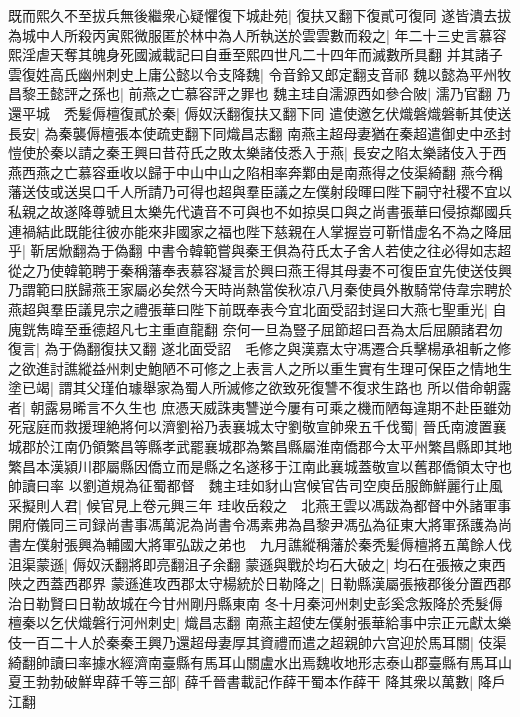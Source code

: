 既而熙久不至拔兵無後繼衆心疑懼復下城赴苑|{
	復扶又翻下復貳可復同}
遂皆潰去拔為城中人所殺丙寅熙微服匿於林中為人所執送於雲雲數而殺之|{
	年二十三史言慕容熙淫虐天奪其魄身死國滅載記曰自垂至熙四世凡二十四年而滅數所具翻}
并其諸子雲復姓高氏幽州刺史上庸公懿以令支降魏|{
	令音鈴又郎定翻支音祁}
魏以懿為平州牧昌黎王懿評之孫也|{
	前燕之亡慕容評之罪也}
魏主珪自濡源西如參合陂|{
	濡乃官翻}
乃還平城　秃髪傉檀復貳於秦|{
	傉奴沃翻復扶又翻下同}
遣使邀乞伏熾磐熾磐斬其使送長安|{
	為秦襲傉檀張本使疏吏翻下同熾昌志翻}
南燕主超母妻猶在秦超遣御史中丞封愷使於秦以請之秦王興曰昔苻氏之敗太樂諸伎悉入于燕|{
	長安之陷太樂諸伎入于西燕西燕之亡慕容垂收以歸于中山中山之陷相率奔鄴由是南燕得之伎渠綺翻}
燕今稱藩送伎或送吳口千人所請乃可得也超與羣臣議之左僕射段暉曰陛下嗣守社稷不宜以私親之故遂降尊號且太樂先代遺音不可與也不如掠吳口與之尚書張華曰侵掠鄰國兵連禍結此既能往彼亦能來非國家之福也陛下慈親在人掌握豈可靳惜虚名不為之降屈乎|{
	靳居焮翻為于偽翻}
中書令韓範嘗與秦王俱為苻氏太子舍人若使之往必得如志超從之乃使韓範聘于秦稱藩奉表慕容凝言於興曰燕王得其母妻不可復臣宜先使送伎興乃謂範曰朕歸燕王家屬必矣然今天時尚熱當俟秋凉八月秦使員外散騎常侍韋宗聘於燕超與羣臣議見宗之禮張華曰陛下前既奉表今宜北面受詔封逞曰大燕七聖重光|{
	自廆皝雋暐至垂德超凡七主重直龍翻}
奈何一旦為豎子屈節超曰吾為太后屈願諸君勿復言|{
	為于偽翻復扶又翻}
遂北面受詔　毛修之與漢嘉太守馮遷合兵擊楊承祖斬之修之欲進討譙縱益州刺史鮑陋不可修之上表言人之所以重生實有生理可保臣之情地生塗已竭|{
	謂其父瑾伯璩舉家為蜀人所滅修之欲致死復讐不復求生路也}
所以借命朝露者|{
	朝露易晞言不久生也}
庶憑天威誅夷讐逆今屢有可乘之機而陋每違期不赴臣雖効死寇庭而救援理絶將何以濟劉裕乃表襄城太守劉敬宣帥衆五千伐蜀|{
	晉氏南渡置襄城郡於江南仍領繁昌等縣孝武罷襄城郡為繁昌縣屬淮南僑郡今太平州繁昌縣即其地繁昌本漢潁川郡屬縣因僑立而是縣之名遂移于江南此襄城蓋敬宣以舊郡僑領太守也帥讀曰率}
以劉道規為征蜀都督　魏主珪如豺山宫候官告司空庾岳服飾鮮麗行止風采擬則人君|{
	候官見上卷元興三年}
珪收岳殺之　北燕王雲以馮跋為都督中外諸軍事開府儀同三司録尚書事馮萬泥為尚書令馮素弗為昌黎尹馮弘為征東大將軍孫護為尚書左僕射張興為輔國大將軍弘跋之弟也　九月譙縱稱藩於秦秃髪傉檀將五萬餘人伐沮渠蒙遜|{
	傉奴沃翻將即亮翻沮子余翻}
蒙遜與戰於均石大破之|{
	均石在張掖之東西陜之西蓋西郡界}
蒙遜進攻西郡太守楊統於日勒降之|{
	日勒縣漢屬張掖郡後分置西郡治日勒賢曰日勒故城在今甘州剛丹縣東南}
冬十月秦河州刺史彭奚念叛降於秃髮傉檀秦以乞伏熾磐行河州刺史|{
	熾昌志翻}
南燕主超使左僕射張華給事中宗正元獻太樂伎一百二十人於秦秦王興乃還超母妻厚其資禮而遣之超親帥六宫迎於馬耳關|{
	伎渠綺翻帥讀曰率據水經濟南臺縣有馬耳山關盧水出焉魏收地形志泰山郡臺縣有馬耳山}
夏王勃勃破鮮卑薛千等三部|{
	薛千晉書載記作薛干蜀本作薛干}
降其衆以萬數|{
	降戶江翻}
